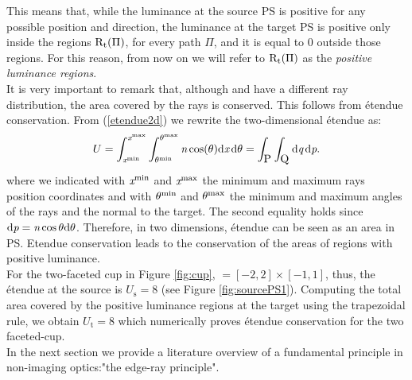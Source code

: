 This means that, while the luminance at the source PS is positive for any possible position and direction, the luminance at the target PS is positive only inside the regions $\mbox{$\textup{R}$}_\textrm{t}(\Pi)$, for every path $\Pi$, and it is equal to $0$ outside those regions. For this reason, from now on we will refer to $\mbox{$\textup{R}$}_\textrm{t}(\Pi)$ as the \textit{positive luminance regions}. \\ \indent
It is very important to remark that, although  and  have a different ray distribution, the area covered by the rays is conserved. This follows from \'{e}tendue conservation. From (\ref{etendue2d}) we rewrite the two-dimensional \'{e}tendue as:
\begin{equation}
U = \int_{\textit{x}^{\textrm{min}}}^{\textit{x}^{\textrm{max}}} \int_{\theta^{\textrm{min}}}^{\theta^{\textrm{max}}} \textit{n} \cos(\theta)\textrm{d}\textit{x}\,\textrm{d}\theta= \int_{\mbox{$\textup{P}_{\textit{}}$}}\int_{\mbox{$\textup{Q}_{\textit{}}$}} \textrm{d}\textit{q}\,\textrm{d}\textit{p}.
\end{equation}
where we indicated with $\textit{x}^{\textrm{min}}$ and $\textit{x}^{\textrm{max}}$ the minimum and maximum rays position coordinates and with $\theta^{\textrm{min}}$ and $\theta^{\textrm{max}}$ the minimum and maximum angles of the rays and the normal to the target. The second equality holds since $\textrm{d}\textit{p}= \textit{n}\cos \theta\textrm{d}\theta$.
Therefore, in two dimensions, \'{e}tendue can be seen as an area in PS. Etendue conservation leads to the conservation of the areas of regions with positive luminance.\\ \indent
For the two-faceted cup in Figure \ref{fig:cup}, $= [-2,2]\times[-1,1]$, thus, the \'{e}tendue at the source is $U_\textrm{s}=8$ (see Figure \ref{fig:sourcePS1}). Computing the total area covered by the positive luminance regions at the target using the trapezoidal rule, we obtain $U_\textrm{t}=8$ which numerically proves \'{e}tendue conservation for the two faceted-cup. \\ \indent 
In the next section we provide a literature overview of a fundamental principle in non-imaging optics:"the edge-ray principle".
